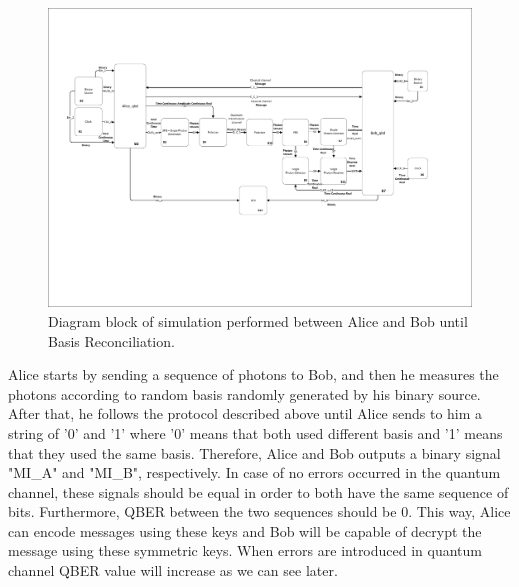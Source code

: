 \begin{refsection}
\begin{figure}[h]
    \centering
        \includegraphics[clip=true, trim=1.2cm 5.0cm 0.5cm 2.5cm, width=1.10\textwidth]{./sdf/bb84_with_discrete_variables/figures/Simulation_toplevel_bb84.pdf}
    \caption{Diagram block of simulation performed between Alice and Bob until Basis Reconciliation. }\label{toplevelalicebob}
\end{figure}

Alice starts by sending a sequence of photons to Bob, and then he measures the photons according to random basis randomly generated by his binary source. After that, he follows the protocol described above until Alice sends to him a string of '0' and '1' where '0' means that both used different basis and '1' means that they used the same basis. Therefore, Alice and Bob outputs a binary signal "MI\_A" and "MI\_B", respectively. In case of no errors occurred in the quantum channel, these signals should be equal in order to both have the same sequence of bits. Furthermore, QBER between the two sequences should be $0$. This way, Alice can encode messages using these keys and Bob will be capable of decrypt the message using these symmetric keys. When errors are introduced in quantum channel QBER value will increase as we can see later.


\end{refsection}
